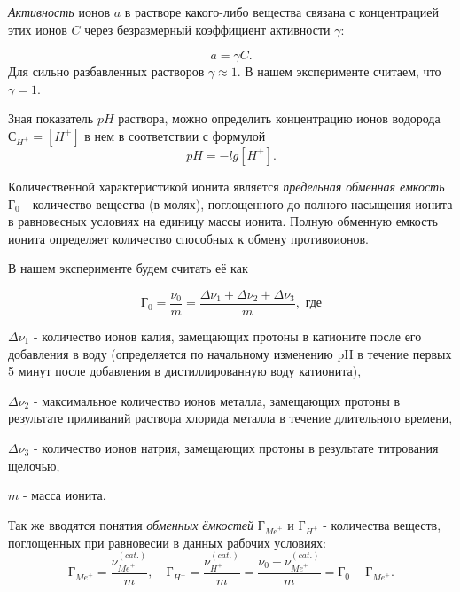 \documentclass[a4paper,12pt]{article} %
\begin{document}
\textit{Активность} ионов $a$ в растворе какого-либо вещества связана с концентрацией этих ионов $C$ через безразмерный коэффициент активности $\gamma$:

\begin{equation}
    a = \gamma C.
\end{equation}
Для сильно разбавленных растворов $\gamma \approx 1$. В нашем эксперименте считаем, что $\gamma = 1$.

Зная показатель $pH$ раствора, можно определить концентрацию ионов водорода $С_{H^{+}} = [H^{+}]$ в нем в соответствии с формулой
\begin{equation}
    pH = - lg [H^{+}].
    \label{eq:eq1}
\end{equation}

Количественной характеристикой ионита является \textit{предельная обменная емкость} $\textit{Г}_0$ - количество вещества (в молях), поглощенного до полного насыщения ионита в равновесных условиях на единицу массы ионита. Полную обменную емкость ионита определяет количество способных к обмену противоионов.

В нашем эксперименте будем считать её как

\begin{equation}
    \textit{Г}_0 = \frac{\nu_0}{m} = \frac{\Delta \nu_1 + \Delta \nu_2 + \Delta \nu_3}{m}, \textrm{ где}
\end{equation}

\hspace{1 cm}$\Delta \nu_1$ -  количество ионов калия, замещающих протоны в катионите после его добавления в воду (определяется по начальному изменению pH в течение первых 5 минут после добавления в дистиллированную воду катионита),

\hspace{1 cm}$\Delta \nu_2$ - максимальное количество ионов металла, замещающих протоны в результате приливаний раствора хлорида металла в течение длительного времени,

\hspace{1 cm}$\Delta \nu_3$ - количество ионов натрия, замещающих протоны в результате
титрования щелочью,

\hspace{1 cm}$m$ - масса ионита.

Так же вводятся понятия \textit{обменных ёмкостей} 
$\textit{Г}_{{Me}^{+}}$ и $\textit{Г}_{{H}^{+}}$ - количества веществ, поглощенных при равновесии в данных рабочих условиях:
\begin{equation}
    \textit{Г}_{{Me}^{+}} = \frac{\nu_{{Me}^+}^{(cat.)}}{m}, \quad \textit{Г}_{{H}^{+}} = \frac{\nu_{{H}^+}^{(cat.)}}{m} = \frac{\nu_0 - \nu_{{Me}^+}^{(cat.)}}{m} = \textit{Г}_0 - \textit{Г}_{{Me}^{+}}.
\end{equation}
\end{document}
